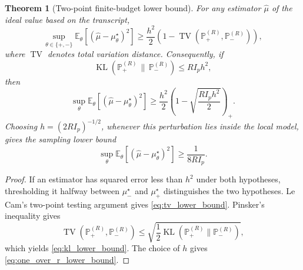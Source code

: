 \documentclass[11pt]{article}
\newtheorem{theorem}{Theorem}
\newcommand{\1}{\mathbf{1}}
\begin{document}
\begin{theorem}[Two-point finite-budget lower bound]
\label{thm:two_point_lower_bound}
For any estimator \(\widehat\mu\) of the ideal value based on the transcript,
\begin{equation}
    \sup_{\theta\in\{+,-\}}
    \mathbb E_\theta\left[(\widehat\mu-\mu_\theta^\star)^2\right]
    \geq
    \frac{h^2}{2}\left(1-\operatorname{TV}\left(\mathbb P_+^{(R)},\mathbb P_-^{(R)}\right)\right),
    \label{eq:tv_lower_bound}
\end{equation}
where \(\operatorname{TV}\) denotes total variation distance.  Consequently, if
\begin{equation}
    \operatorname{KL}\left(\mathbb P_+^{(R)}\,\|\,\mathbb P_-^{(R)}\right)\leq R I_p h^2,
    \label{eq:local_kl_condition}
\end{equation}
then
\begin{equation}
    \sup_{\theta}
    \mathbb E_\theta\left[(\widehat\mu-\mu_\theta^\star)^2\right]
    \geq
    \frac{h^2}{2}\left(1-\sqrt{\frac{R I_p h^2}{2}}\right)_+.
    \label{eq:kl_lower_bound}
\end{equation}
Choosing \(h=(2RI_p)^{-1/2}\), whenever this perturbation lies inside the local model, gives the sampling lower bound
\begin{equation}
    \sup_\theta
    \mathbb E_\theta\left[(\widehat\mu-\mu_\theta^\star)^2\right]
    \geq
    \frac{1}{8RI_p}.
    \label{eq:one_over_r_lower_bound}
\end{equation}
\end{theorem}

\begin{proof}
If an estimator has squared error less than \(h^2\) under both hypotheses, thresholding it halfway between \(\mu_-^\star\) and \(\mu_+^\star\) distinguishes the two hypotheses.  Le Cam's two-point testing argument gives \cref{eq:tv_lower_bound}.  Pinsker's inequality gives
\begin{equation}
    \operatorname{TV}(\mathbb P_+^{(R)},\mathbb P_-^{(R)})
    \leq
    \sqrt{\frac12\operatorname{KL}(\mathbb P_+^{(R)}\|\mathbb P_-^{(R)})},
\end{equation}
which yields \cref{eq:kl_lower_bound}.  The choice of \(h\) gives \cref{eq:one_over_r_lower_bound}.
\end{proof}
\end{document}
